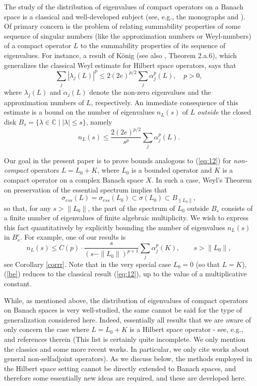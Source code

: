 \documentclass[12pt,a4paper]{article}
\theoremstyle{definition}
\theoremstyle{remark}
\numberwithin{equation}{section}
\newcommand{\mc}{{\mathbb C}}
\begin{document}
The study of the distribution of eigenvalues of compact operators on a Banach space is a classical and well-developed subject (see, e.g., the monographs \cite{koenig} and \cite{pietsch}). Of primary concern is the problem of relating summability properties of some sequence of singular numbers (like the approximation numbers or Weyl-numbers) of a compact operator $L$ to the summability properties of its sequence of eigenvalues. For instance, a result of K\"onig \cite{MR0482266} (see also \cite{koenig}, Theorem 2.a.6), which generalizes the classical Weyl estimate for Hilbert space operators, says that 
\begin{equation*} 
 \sum_{j} |\lambda_j(L)|^p \leq 2(2e)^{p/2} \sum_{j} \alpha_j^p(L), \quad p>0,
\end{equation*}
where $\lambda_j(L)$ and $\alpha_j(L)$ denote the non-zero eigenvalues and the approximation numbers of $L$, respectively. An immediate consequence of this estimate is a bound on the number of eigenvalues $n_L(s)$  of $L$ {\it{outside}} the closed disk $B_s=\{\lambda\in \mc\;|\; |\lambda|\leq s\}$, namely 
\begin{equation}
  \label{eq:12}
n_L(s) \leq  \frac{2(2e)^{p/2}}{s^p}  \sum_{j} \alpha_j^p(L).  
\end{equation}

Our goal in the present paper is to prove bounds analogous to (\ref{eq:12}) for \emph{non-compact} operators $L=L_0+K$, where $L_0$ is a bounded operator and $K$ is a compact operator on a complex Banach space $X$. In such a case, Weyl's Theorem on preservation of the essential spectrum implies that  
$$\sigma_{ess}(L)=\sigma_{ess}(L_0)\subset \sigma(L_0)\subset B_{\|L_0\|},$$
so that, for any $s>\|L_0\|$, the part of the spectrum of $L_0$ outside $B_s$ consists of   
a finite number of eigenvalues of finite algebraic multiplicity. We wish to express this fact quantitatively by explicitly bounding the number of eigenvalues $n_L(s)$ in $B_s^c$. 
For example, one of our results is 
\begin{equation}\label{be}n_L(s) \leq C(p)\cdot  \frac{s}{(s-\|L_0\|)^{p+1}}  \sum_{j}\alpha_j^p(K) ,\qquad s>\|L_0\|,
\end{equation} 
see Corollary \ref{corrr}.  Note that in the very special case $L_0=0$ (so that $L=K$), (\ref{be}) reduces to the classical result (\ref{eq:12}), up to the value of a multiplicative constant. 


While, as mentioned above, the distribution of eigenvalues of compact operators on Banach spaces is very well-studied, the same cannot be said for the type of generalization considered here. Indeed, essentially all results that we are aware of only concern the case where $L=L_0+K$ is a  Hilbert space operator - see, e.g., \cite{gohberg2, MR925418, MR2559715, demuth,  MR3054310, MR2463978} and references therein (This list is certainly quite incomplete. We only mention the classics and some more recent works. In particular, we only cite works about general non-selfadjoint operators). As we discuss below, the methods employed in the Hilbert space setting cannot be directly extended to Banach spaces, and therefore
some essentially new ideas are required, and these are developed here.
\end{document}

